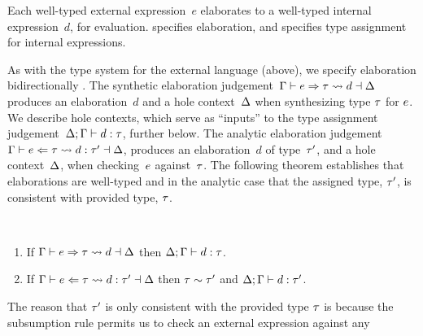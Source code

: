 


Each well-typed external expression~$e$ elaborates to a well-typed internal
expression~$d$, for evaluation.
%
 specifies elaboration, and 
specifies type assignment for internal expressions.
%

As with the type system for the external language (above), we specify
elaboration bidirectionally \cite{DBLP:conf/ppdp/FerreiraP14}.
%
The synthetic elaboration
judgement~$\Gamma \vdash e \Rightarrow \tau \leadsto d \dashv \Delta$
%
produces an elaboration~$d$ and a hole context~$\Delta$ when synthesizing
type $\tau$ for $e$.
%
We describe hole contexts, which serve as ``inputs'' to the type assignment
judgement~$\Delta; \Gamma \vdash d : \tau$, further below.
%
The analytic elaboration
judgement~$\Gamma \vdash e \Leftarrow \tau \leadsto d : \tau' \dashv \Delta$,
produces an elaboration~$d$ of type~$\tau'$, and a hole context~$\Delta$,
when checking~$e$ against~$\tau$.
%
The following theorem establishes that elaborations are well-typed and in
the analytic case that the assigned type, $\tau'$, is consistent with
provided type, $\tau$.
%
\begin{thm}\label{thm:typed-elaboration} ~
  \begin{enumerate}[nolistsep]
    \item
      If $\Gamma \vdash e \Rightarrow \tau \leadsto d \dashv \Delta$
      then $\Delta; \Gamma \vdash d : \tau$.
    \item
      If $\Gamma \vdash e \Leftarrow \tau \leadsto d : \tau' \dashv \Delta$ then
      $\tau \sim \tau'$ and
      $\Delta; \Gamma \vdash d : \tau'$.
  \end{enumerate}
\end{thm}
\noindent
%
%
The reason that $\tau'$ is only consistent with the provided type $\tau$ is because
%
the subsumption rule permits us to check an external expression against any
